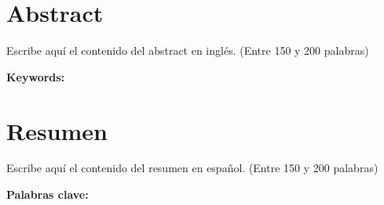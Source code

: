   \clearpage
  \chapter*{Abstract}
  Escribe aquí el contenido del abstract en inglés. (Entre 150 y 200 palabras)

  \vspace{1cm}
  \textbf{Keywords:} %


  \clearpage
  \chapter*{Resumen}
  Escribe aquí el contenido del resumen en español. (Entre 150 y 200 palabras)

  \vspace{1cm}
  \textbf{Palabras clave:} %
  